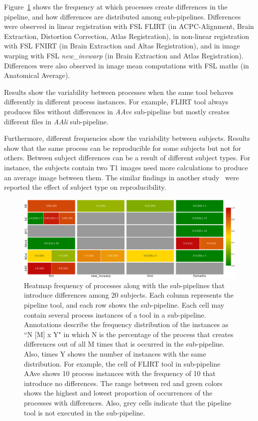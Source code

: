 \documentclass[a4paper,num-refs]{oup-contemporary}
\begin{document}
Figure~\ref{fig:pfs_freq} shows the frequency at which  processes create differences 
in the pipeline, and how differences are distributed among sub-pipelines.
Differences were observed in linear registration 
with FSL FLIRT (in ACPC-Alignment, Brain Extraction, Distortion Correction, 
Atlas Registration), in non-linear registration with FSL FNIRT (in Brain Extraction 
and Altas Registration), and in image warping with FSL \emph{new\_invwarp} (in Brain Extraction 
and Atlas Registration). Differences were also observed in image mean 
computations with FSL maths  (in Anatomical Average). 

Results show the variability between processes when 
the same tool behaves differently in different process instances. For example, 
FLIRT tool always produces files without differences in \emph{AAve} sub-pipeline but 
mostly creates different files in \emph{AAli} sub-pipeline.

Furthermore, different frequencies show the variability between subjects.
Results show that the same process can be reproducible for some subjects but not for others. 
Between subject differences can be a result of different subject types. 
For instance, the subjects contain two T1 images need more calculations 
to produce an average image between them.
The similar findings in another study~\cite{bowring2019exploring} were reported 
the effect of subject type on reproducibility.

\begin{figure}
\centering
  \includegraphics[width=\textwidth]{images/pfs_heatmap.png}
  \caption{Heatmap frequency of processes along with the sub-pipelines that introduce 
           differences among 20 subjects. 
           Each column represents the pipeline tool, and each row shows the sub-pipeline.
           Each cell may contain several process instances of a tool in a sub-pipeline.
           Annotations describe the frequency distribution of the instances as ``N [M] x Y" 
           in which N is the percentage of the process 
           that creates differences out of all M times that is occurred in the sub-pipeline. 
           Also, times Y shows the number of instances with the same distribution.
           For example, the cell of FLIRT tool in sub-pipeline AAve shows 10 process instances  
           with the frequency of 10 that introduce no differences.
           The range between red and green colors shows the highest and lowest 
           proportion of occurrences of the processes with differences.
           Also, grey cells indicate that the pipeline tool is not executed in the sub-pipeline.}
  \label{fig:pfs_freq}
\end{figure}
\end{document}
